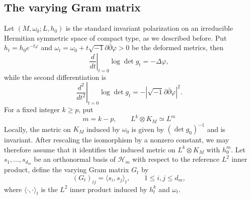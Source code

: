 \documentclass[11pt,reqno]{amsart}
\theoremstyle{corollary}
\theoremstyle{conjecture}
\theoremstyle{assumption}
\theoremstyle{proposition}
\theoremstyle{remark}
\numberwithin{equation}{section}
\newcommand{\ii}{\ensuremath{\sqrt{-1}}}
\newcommand{\pa}{\partial}
\newcommand{\pp}{\bar\partial}
\begin{document}
\subsection{The varying Gram matrix}\label{subsec:varyingGram}
Let $(M,\omega_0;L,h_0)$ is the standard invariant polarization on an irreducible Hermitian symmetric space of compact type, as we described before. Put $h_t=h_0e^{-t\varphi}$ and $\omega_t=\omega_0+t\ii\pa\pp \varphi>0$ be the deformed metrics, then
\begin{equation}\label{eq:volume-first-variation}
\left.\frac{d}{dt}\right |_{t=0}\log \det g_t=-\Delta \varphi,
\end{equation}
while the second differentiation is
\begin{equation}\label{eq:volume-second-variation}
\left.\frac{d^2}{dt^2}\right |_{t=0}\log \det g_t=-|\ii\pa\pp \varphi|^2.
\end{equation}
For a fixed integer $k\geq p$, put
\[
m=k-p,\qquad L^k\otimes K_M\simeq L^m
\]
Locally, the metric on $K_M$ induced by $\omega_0$ is given by $(\det g_0)^{-1}$ and is invariant. After rescaling the isomorphism by a nonzero constant, we may therefore assume that it identifies the induced metric on $L^k\otimes K_M$ with $h_0^m$. Let $s_1,\ldots,s_{d_m}$ be an orthonormal basis of $\mathcal H_m$ with respect to the reference $L^2$ inner product, define the varying Gram matrix $G_t$ by
\[
(G_t)_{ij}=\langle s_i,s_j\rangle_t,\qquad 1\leq i,j\leq d_m,
\]
where $\langle\cdot,\cdot\rangle_t$ is the $L^2$ inner product induced by $h_t^k$ and $\omega_t$.
\end{document}
